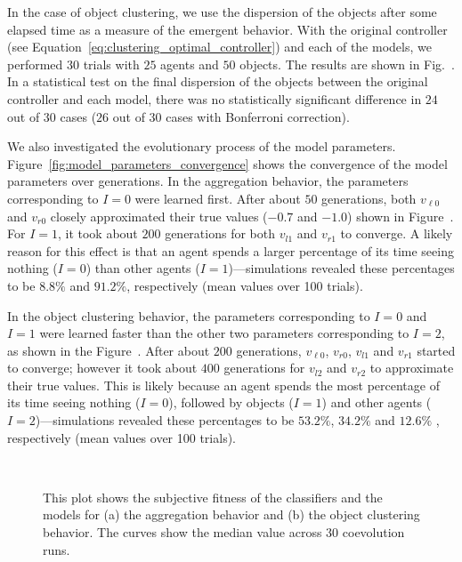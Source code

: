 In the case of object clustering, we use the dispersion of the objects after some elapsed time as a measure of the emergent behavior. With the original controller (see Equation~\eqref{eq:clustering_optimal_controller}) and each of the models, we performed $30$ trials with $25$ agents and $50$ objects. The results are shown in Fig.~. In a statistical test on the final dispersion of the objects between the original controller and each model, there was no statistically significant difference in $24$ out of $30$ cases ($26$ out of $30$ cases with Bonferroni correction).

We also investigated the evolutionary process of the model parameters. Figure~\ref{fig:model_parameters_convergence} shows the convergence of the model parameters over generations. In the aggregation behavior, the parameters corresponding to $I=0$ were learned first. After about $50$ generations, both $v_{\ell0}$ and $v_{r0}$ closely approximated their true values ($-0.7$ and $-1.0$) shown in Figure~. For $I=1$, it took about $200$ generations for both $v_{l1}$ and $v_{r1}$ to converge. A likely reason for this effect is that an agent spends a larger percentage of its time seeing nothing ($I=0$) than other agents ($I=1$)---simulations revealed these percentages to be $8.8\%$ and $91.2\%$, respectively (mean values over 100 trials). 

In the object clustering behavior, the parameters corresponding to $I=0$ and $I=1$ were learned faster than the other two parameters corresponding to $I=2$, as shown in the Figure~. After about $200$ generations, $v_{\ell0}$, $v_{r0}$, $v_{l1}$ and $v_{r1}$ started to converge; however it took about $400$ generations for $v_{l2}$ and $v_{r2}$ to approximate their true values. This is likely because an agent spends the most percentage of its time seeing nothing ($I=0$), followed by objects ($I=1$) and other agents ($I=2$)---simulations revealed these percentages to be $53.2\%$, $34.2\%$ and $12.6\%$ , respectively (mean values over 100 trials).

\begin{figure}[!t]%
	\centering
		\\
		\caption{This plot shows the subjective fitness of the classifiers and
		the models for (a) the aggregation behavior and (b) the object clustering behavior.
		The curves show the median value across 30 coevolution runs.\label{fig:fitness_dynamics_simulation}}
\end{figure}

